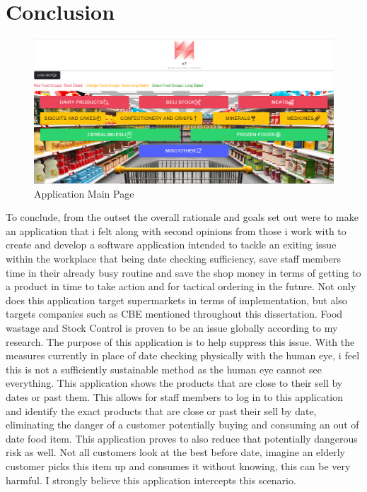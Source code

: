 \chapter{Conclusion}

\begin{figure}[h!]
	\caption{Application Main Page}
	\label{image:dashboard}
	\centering
	\includegraphics[width=1\textwidth]{images/dashboard.PNG}
\end{figure}

To conclude, from the outset the overall rationale and goals set out were to make an application that i felt along with second opinions from those i work with to create and develop a software application intended to tackle an exiting issue within the workplace that being date checking sufficiency, save staff members time in their already busy routine and save the shop money in terms of getting to a product in time to take action and for tactical ordering in the future. Not only does this application target supermarkets in terms of implementation, but also targets companies such as CBE mentioned throughout this dissertation. 
\newline
\newpage
Food wastage and Stock Control is proven to be an issue globally according to my research. The purpose of this application is to help suppress this issue. With the measures currently in place of date checking physically with the human eye, i feel this is not a sufficiently sustainable method as the human eye cannot see everything. This application shows the products that are close to their sell by dates or past them. This allows for staff members to log in to this application and identify the exact products that are close or past their sell by date, eliminating the danger of a customer potentially buying and consuming an out of date food item. This application proves to also reduce that potentially dangerous risk as well. Not all customers look at the best before date, imagine an elderly customer picks this item up and consumes it without knowing, this can be very harmful. I strongly believe this application intercepts this scenario. 
\newline

